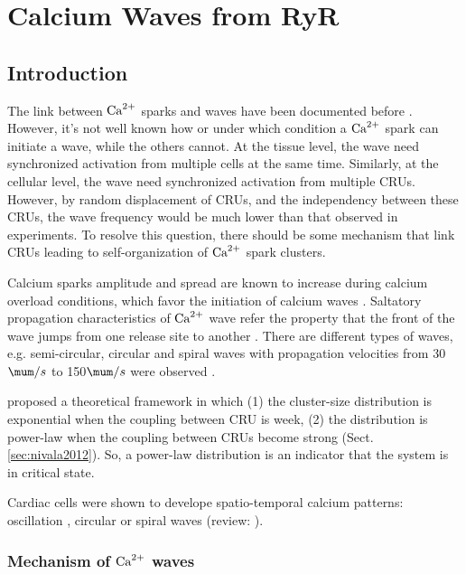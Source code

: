 \chapter{Calcium Waves from RyR}
\label{chap:calcium_waves_RYR}


\section{Introduction}

The link between ${\text{Ca}^{2+}}$ sparks and waves have been documented before
\citep{cheng1996csc,wier1997, lukyanenko1999}. However, it's not well known how
or under which condition a ${\text{Ca}^{2+}}$ spark can initiate a wave, while the others
cannot. At the tissue level, the wave need synchronized activation from multiple
cells at the same time. Similarly, at the cellular level, the wave need
synchronized activation from multiple CRUs. However, by random displacement of
CRUs, and the independency between these CRUs, the wave frequency would be much
lower than that observed in experiments. To resolve this question, there should
be some mechanism that link CRUs leading to self-organization of ${\text{Ca}^{2+}}$ spark
clusters. 

Calcium sparks amplitude and spread are known to increase during calcium
overload conditions, which favor the initiation of calcium waves
\citep{cheng1996csc}. Saltatory propagation characteristics of ${\text{Ca}^{2+}}$ wave refer
the property that the front of the wave jumps from one release site to
another \citep{keizer1998}. There are different types of waves, e.g.
semi-circular, circular and spiral waves with propagation velocities from
30$\mum/s$ to 150$\mum/s$ were observed \citep{engel1994apc, takamatsu1990,
wussling1996}.

\citep{nivala2012} proposed a theoretical framework in which (1) the
cluster-size distribution is exponential when the coupling between CRU is week,
(2) the distribution is power-law when the coupling between CRUs become strong
(Sect.\ref{sec:nivala2012}). So, a power-law distribution is an indicator that
the system is in critical state.

Cardiac cells were shown to develope spatio-temporal calcium patterns:
oscillation \citep{wier1991}, circular \citep{williams1992, takamatsu1990} or
spiral waves \citep{lipp1993} (review: \citep{wussling1999}).

\subsection{Mechanism of ${\text{Ca}^{2+}}$ waves}

